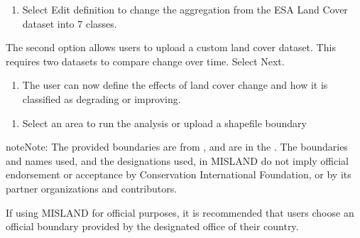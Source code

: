 \documentclass[letterpaper,10pt,english]{sphinxmanual}
\begin{document}
\begin{enumerate}
%
\setcounter{enumi}{2}
\item {} 
\sphinxAtStartPar
Select Edit definition to change the aggregation from the ESA Land Cover
dataset into 7 classes.

\end{enumerate}


\sphinxAtStartPar
The second option allows users to upload a custom land cover dataset. This
requires two datasets to compare change over time. Select Next.

\begin{enumerate}
%
\setcounter{enumi}{3}
\item {} 
\sphinxAtStartPar
The user can now define the effects of land cover change and how it is
classified as degrading or improving.

\end{enumerate}

\begin{enumerate}
%
\setcounter{enumi}{4}
\item {} 
\sphinxAtStartPar
Select an area to run the analysis or upload a shapefile boundary

\end{enumerate}

\begin{sphinxadmonition}{note}{Note:}
\sphinxAtStartPar
The provided boundaries are from , and are in the . The boundaries and names
used, and the designations used, in MISLAND do not imply official
endorsement or acceptance by Conservation International Foundation, or by
its partner organizations and contributors.

\sphinxAtStartPar
If using MISLAND for official purposes, it is recommended that users
choose an official boundary provided by the designated office of their
country.
\end{sphinxadmonition}
\end{document}
